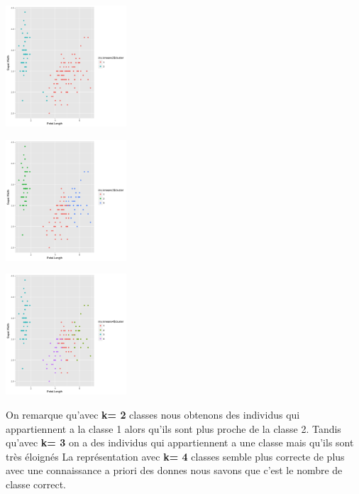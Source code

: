 \documentclass[10pt]{article}
\begin{document}
		\begin{minipage}{.5\textwidth}
		\includegraphics[width=45mm]{Figures/Iris_2/kmeans2.png}
		\label{fig:iris_kmeans2}
	\end{minipage}%
	\hspace{0.02\linewidth}
	\begin{minipage}{.5\textwidth}
		\includegraphics[width=45mm]{Figures/Iris_2/kmeans3.png}
		\label{fig:iris_kmens3}
	\end{minipage}
	\vspace{0.1mm}
	\begin{center}
		\includegraphics[width=45mm]{Figures/Iris_2/kmeans4.png}
		\label{fig:iris_kmens4}
	\end{center}

On remarque qu'avec \textbf{k= 2 }classes nous obtenons des individus qui appartiennent a la classe 1 alors qu'ils sont plus proche de la classe 2. Tandis qu'avec \textbf{k= 3} on a des individus qui appartiennent a une classe mais qu'ils sont très éloignés La représentation avec \textbf{k= 4} classes semble plus correcte de plus avec une connaissance a priori des donnes nous savons que c'est le nombre de classe correct.\\
\end{document}
